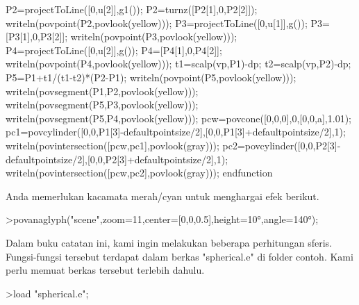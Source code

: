 \documentclass[a4paper,10pt]{article}
\begin{document}
\begin{eulernotebook}
\begin{eulercomment}
\begin{eulercomment}
\begin{eulercomment}
\begin{eulercomment}
\begin{eulercomment}
\begin{eulercomment}
\begin{eulercomment}
\begin{eulercomment}
\begin{eulercomment}
\begin{eulercomment}
\begin{eulercomment}
\begin{eulercomment}
\begin{eulercomment}
\begin{eulercomment}
\begin{eulercomment}
\begin{eulercomment}
\begin{eulercomment}
\begin{eulercomment}
\begin{eulercomment}
\begin{eulercomment}
\begin{eulercomment}
\begin{eulercomment}
\begin{eulercomment}
\begin{eulercomment}
\begin{eulercomment}
\begin{eulercomment}
\begin{eulercomment}
\begin{eulercomment}
\begin{eulercomment}
\begin{eulercomment}
\begin{eulercomment}
\begin{eulercomment}
\begin{eulercomment}
\begin{eulercomment}
\begin{eulerudf}
  P2=projectToLine([0,u[2]],g1()); P2=turnz([P2[1],0,P2[2]]);
  writeln(povpoint(P2,povlook(yellow)));
  P3=projectToLine([0,u[1]],g()); P3=[P3[1],0,P3[2]];
  writeln(povpoint(P3,povlook(yellow)));
  P4=projectToLine([0,u[2]],g()); P4=[P4[1],0,P4[2]];
  writeln(povpoint(P4,povlook(yellow)));
  t1=scalp(vp,P1)-dp; t2=scalp(vp,P2)-dp; P5=P1+t1/(t1-t2)*(P2-P1);
  writeln(povpoint(P5,povlook(yellow)));
  writeln(povsegment(P1,P2,povlook(yellow)));
  writeln(povsegment(P5,P3,povlook(yellow)));
  writeln(povsegment(P5,P4,povlook(yellow)));
  pcw=povcone([0,0,0],0,[0,0,a],1.01);
  pc1=povcylinder([0,0,P1[3]-defaultpointsize/2],[0,0,P1[3]+defaultpointsize/2],1);
  writeln(povintersection([pcw,pc1],povlook(gray)));
  pc2=povcylinder([0,0,P2[3]-defaultpointsize/2],[0,0,P2[3]+defaultpointsize/2],1);
  writeln(povintersection([pcw,pc2],povlook(gray)));
  endfunction
\end{eulerudf}
\begin{eulercomment}
Anda memerlukan kacamata merah/cyan untuk menghargai efek berikut.
\end{eulercomment}
\begin{eulerprompt}
>povanaglyph("scene",zoom=11,center=[0,0,0.5],height=10°,angle=140°);
\end{eulerprompt}
\begin{eulercomment}
Dalam buku catatan ini, kami ingin melakukan beberapa perhitungan
sferis. Fungsi-fungsi tersebut terdapat dalam berkas "spherical.e" di
folder contoh. Kami perlu memuat berkas tersebut terlebih dahulu.
\end{eulercomment}
\begin{eulerprompt}
>load "spherical.e";
\end{eulerprompt}
\begin{eulercomment}

\end{eulercomment}
\end{eulercomment}
\end{eulercomment}
\end{eulercomment}
\end{eulercomment}
\end{eulercomment}
\end{eulercomment}
\end{eulercomment}
\end{eulercomment}
\end{eulercomment}
\end{eulercomment}
\end{eulercomment}
\end{eulercomment}
\end{eulercomment}
\end{eulercomment}
\end{eulercomment}
\end{eulercomment}
\end{eulercomment}
\end{eulercomment}
\end{eulercomment}
\end{eulercomment}
\end{eulercomment}
\end{eulercomment}
\end{eulercomment}
\end{eulercomment}
\end{eulercomment}
\end{eulercomment}
\end{eulercomment}
\end{eulercomment}
\end{eulercomment}
\end{eulercomment}
\end{eulercomment}
\end{eulercomment}
\end{eulercomment}
\end{eulercomment}
\end{eulernotebook}
\end{document}
